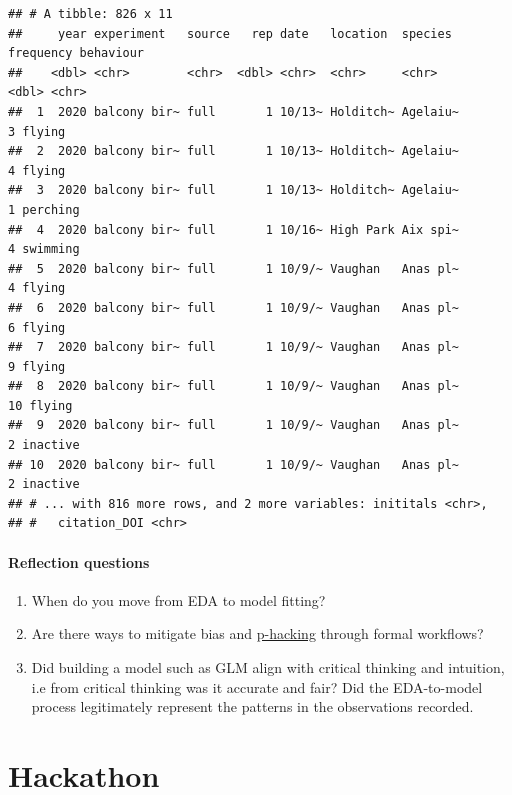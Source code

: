 \documentclass[
]{book}
\providecommand{\tightlist}{%
  \setlength{\itemsep}{0pt}\setlength{\parskip}{0pt}}
\begin{document}
\begin{verbatim}
## # A tibble: 826 x 11
##     year experiment   source   rep date   location  species  frequency behaviour
##    <dbl> <chr>        <chr>  <dbl> <chr>  <chr>     <chr>        <dbl> <chr>    
##  1  2020 balcony bir~ full       1 10/13~ Holditch~ Agelaiu~         3 flying   
##  2  2020 balcony bir~ full       1 10/13~ Holditch~ Agelaiu~         4 flying   
##  3  2020 balcony bir~ full       1 10/13~ Holditch~ Agelaiu~         1 perching 
##  4  2020 balcony bir~ full       1 10/16~ High Park Aix spi~         4 swimming 
##  5  2020 balcony bir~ full       1 10/9/~ Vaughan   Anas pl~         4 flying   
##  6  2020 balcony bir~ full       1 10/9/~ Vaughan   Anas pl~         6 flying   
##  7  2020 balcony bir~ full       1 10/9/~ Vaughan   Anas pl~         9 flying   
##  8  2020 balcony bir~ full       1 10/9/~ Vaughan   Anas pl~        10 flying   
##  9  2020 balcony bir~ full       1 10/9/~ Vaughan   Anas pl~         2 inactive 
## 10  2020 balcony bir~ full       1 10/9/~ Vaughan   Anas pl~         2 inactive 
## # ... with 816 more rows, and 2 more variables: inititals <chr>,
## #   citation_DOI <chr>
\end{verbatim}

\hypertarget{reflection-questions-3}{%
\subsubsection*{Reflection questions}\label{reflection-questions-3}}

\begin{enumerate}
\def\labelenumi{\arabic{enumi}.}
\tightlist
\item
  When do you move from EDA to model fitting?\\
\item
  Are there ways to mitigate bias and \href{https://www.wired.com/story/were-all-p-hacking-now/}{p-hacking} through formal workflows?\\
\item
  Did building a model such as GLM align with critical thinking and intuition, i.e from critical thinking was it accurate and fair? Did the EDA-to-model process legitimately represent the patterns in the observations recorded.
\end{enumerate}

\hypertarget{hackathon}{%
\chapter{Hackathon}\label{hackathon}}
\end{document}
